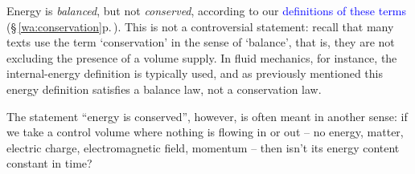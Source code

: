 \documentclass[a4paper,12pt,%
onecolumn,oneside,%
british%
]{memoir}
\renewcommand*{\|}[1][]{\nonscript\:#1\vert\nonscript\:\mathopen{}}
\newcommand*{\sect}{\S}%
\newcommand*{\eqn}{eq.}%
\renewcommand*{\autoref}[3][\sect\,\ref]{\textcolor{blue}{#3} {\color{blue}\scriptsize(\faIcon[regular]{eye}\;#1{#2}\;p.\,\pageref{#2})}}
\begin{document}
Energy is \emph{balanced}, but not \emph{conserved}, according to our \autoref{wa:conservation}{definitions of these terms}. This is not a controversial statement: recall that many texts use the term \enquote*{conservation} in the sense of \enquote*{balance}, that is, they are not excluding the presence of a volume supply.
%
%
In fluid mechanics, for instance, the internal-energy definition is typically used, and as previously mentioned this energy definition satisfies a balance law, not a conservation law.

The statement \enquote{energy is conserved}, however, is often meant in another sense: if we take a control volume where nothing is flowing in or out -- no energy, matter, electric charge, electromagnetic field, momentum -- then isn't its energy content constant in time?
\end{document}
